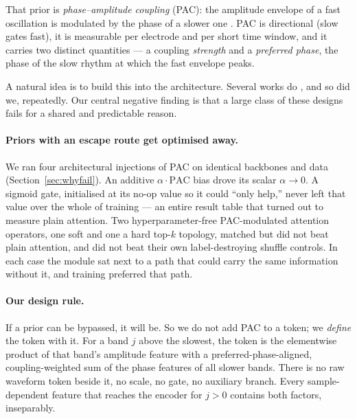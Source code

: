 \documentclass{article}
\begin{document}
That prior is \emph{phase--amplitude coupling} (PAC): the amplitude envelope of a
fast oscillation is modulated by the phase of a slower one
\citep{canolty2006high,tort2010measuring}. PAC is directional (slow gates fast),
it is measurable per electrode and per short time window, and it carries two
distinct quantities --- a coupling \emph{strength} and a \emph{preferred phase},
the phase of the slow rhythm at which the fast envelope peaks.

A natural idea is to build this into the architecture. Several works do
\citep{lemkhenter2020phaseswap,li2023pacnet,li2023complexpac,lee2026sleeppacnet},
and so did we, repeatedly. Our central negative finding is that a large class of
these designs fails for a shared and predictable reason.

\paragraph{Priors with an escape route get optimised away.}
We ran four architectural injections of PAC on identical backbones and data
(Section~\ref{sec:whyfail}). An additive $\alpha \cdot \mathrm{PAC}$ bias drove
its scalar $\alpha \to 0$. A sigmoid gate, initialised at its no-op value so it
could ``only help,'' never left that value over the whole of training --- an
entire result table that turned out to measure plain attention. Two hyperparameter-free
PAC-modulated attention operators, one soft and one a hard top-$k$ topology,
matched but did not beat plain attention, and did not beat their own
label-destroying shuffle controls. In each case the module sat next to a path
that could carry the same information without it, and training preferred that
path.

\paragraph{Our design rule.}
If a prior can be bypassed, it will be. So we do not add PAC to a token; we
\emph{define} the token with it. For a band $j$ above the slowest, the token is
the elementwise product of that band's amplitude feature with a
preferred-phase-aligned, coupling-weighted sum of the phase features of all
slower bands. There is no raw waveform token beside it, no scale, no gate, no
auxiliary branch. Every sample-dependent feature that reaches the encoder for
$j>0$ contains both factors, inseparably.
\end{document}
